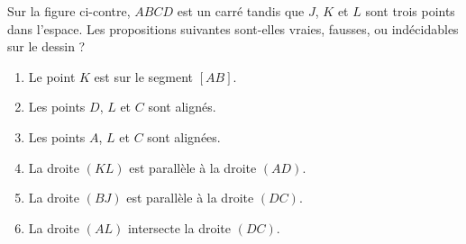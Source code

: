
\begin{exercice}\label{exoSeconde-0091}

    \begin{multicols}{2}
    Sur la figure ci-contre, \( ABCD\) est un carré tandis que \( J\), \( K\) et \( L\) sont trois points dans l'espace. Les propositions suivantes sont-elles vraies, fausses, ou indécidables sur le dessin ?
    \begin{enumerate}
        \item
            Le point \( K\) est sur le segment \( [AB]\).
        \item
            Les points \( D\), \( L\) et \( C\) sont alignés.
        \item
            Les points \( A\), \( L\) et \( C\) sont alignées.
        \item
            La droite \( (KL)\) est parallèle à la droite \( (AD)\).
        \item
            La droite \( (BJ)\) est parallèle à la droite \( (DC)\).
        \item
            La droite \( (AL)\) intersecte la droite \( (DC)\).
    \end{enumerate}

\columnbreak

\begin{center}

\end{center}

    \end{multicols}
    

\end{exercice}
